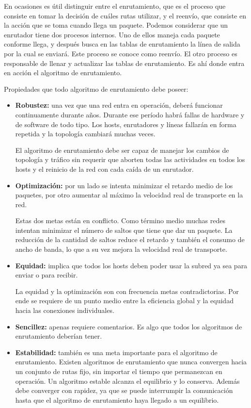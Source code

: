 \documentclass[10pt,a4paper]{report}
\begin{document}
	\par En ocasiones es útil distinguir entre el enrutamiento, que es el proceso que 
	consiste en tomar la decisión de cuáles rutas utilizar, y el reenvío, que consiste en la 
	acción que se toma cuando llega un paquete. Podemos considerar que un enrutador 
	tiene dos procesos internos. Uno de ellos maneja cada paquete conforme llega, y 
	después busca en las tablas de enrutamiento la línea de salida por la cual se enviará. 
	Este proceso se conoce como reenvío. El otro proceso es responsable de llenar y 
	actualizar las tablas de enrutamiento. Es ahí donde entra en acción el algoritmo de 
	enrutamiento.
	
	\par Propiedades que todo algoritmo de enrutamiento debe poseer:
		\begin{itemize}
			\item \textbf{Robustez:} una vez que una red entra en operación, deberá
			funcionar 			
			continuamente durante años. Durante ese período habrá fallas de hardware y de 
			software de todo tipo. Los hosts, enrutadores y líneas fallarán en forma 
			repetida y la topología cambiará muchas veces.
			\par El algoritmo de enrutamiento debe ser capaz de manejar los cambios de 
			topología y tráfico sin requerir que aborten todas las actividades en todos los 
			hosts y el reinicio de la red con cada caída de un enrutador.
			\item \textbf{Optimización:} por un lado se intenta minimizar el 
			retardo medio de los paquetes, por otro aumentar al máximo la velocidad real 
			de transporte en la red. 
			\par Estas dos metas están en conflicto. Como término medio muchas redes 
			intentan minimizar el número de saltos que tiene que dar un paquete.
			La reducción de la cantidad de saltos reduce el retardo y también el consumo 
			de ancho de banda, lo que a su vez mejora la velocidad real de transporte.
			\item \textbf{Equidad:} implica que todos los hosts deben poder usar la subred 
			ya sea para enviar o para recibir.
			\par La equidad y la optimización son con frecuencia metas contradictorias. Por 
			ende se requiere de un punto medio entre la eficiencia global y la equidad hacia 
			las conexiones individuales.
			\item \textbf{Sencillez:} apenas requiere comentarios. Es algo que todos los 
			algoritmos de enrutamiento deberían tener. 
			\item \textbf{Estabilidad:} también es una meta importante para el algoritmo 
			de enrutamiento. Existen algoritmos de enrutamiento que nunca convergen 
			hacia un conjunto de rutas fijo, sin importar el tiempo que permanezcan en 
			operación. Un algoritmo estable alcanza el equilibrio y lo conserva. Además 
			debe converger con rapidez, ya que se puede interrumpir la comunicación hasta 
			que el algoritmo de enrutamiento haya llegado a un equilibrio.
		\end{itemize}
		
\end{document}
